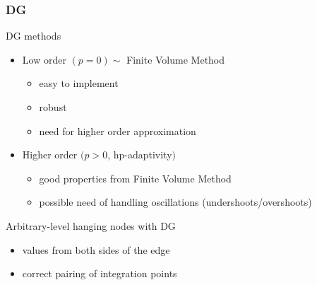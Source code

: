 \documentclass{beamer}
\begin{document}
\begin{frame}
\frametitle{DG}
\begin{center}
DG methods
\end{center}
\begin{itemize}
\item
Low order $(p = 0) \sim$ Finite Volume Method
\begin{itemize}
\item easy to implement
\item robust
\item need for higher order approximation
\end{itemize}
\item 
Higher order $(p > 0$, hp-adaptivity$)$
\begin{itemize}
\item
good properties from Finite Volume Method
\item
possible need of handling oscillations (undershoots/overshoots)
\end{itemize}
\end{itemize}
\vspace{5mm}
\begin{center}
Arbitrary-level hanging nodes with DG
\end{center}
\begin{itemize}
\item
values from both sides of the edge
\item
correct pairing of integration points
\end{itemize}
\end{frame}
\end{document}
